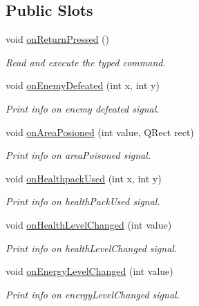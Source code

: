 \subsection*{Public Slots}
\begin{DoxyCompactItemize}
\item 
void \hyperlink{classWorldTerminalView_abca57ada64d0d466fad4e48b26283ee7}{on\+Return\+Pressed} ()\hypertarget{classWorldTerminalView_abca57ada64d0d466fad4e48b26283ee7}{}\label{classWorldTerminalView_abca57ada64d0d466fad4e48b26283ee7}

\begin{DoxyCompactList}\small\item\em Read and execute the typed command. \end{DoxyCompactList}\item 
void \hyperlink{classWorldTerminalView_a39a7a5c66e6184474cf5e43182cca8df}{on\+Enemy\+Defeated} (int x, int y)
\begin{DoxyCompactList}\small\item\em Print info on enemy defeated signal. \end{DoxyCompactList}\item 
void \hyperlink{classWorldTerminalView_ab6ebb9b798c452dbb7bc6859e6c0082c}{on\+Area\+Posioned} (int value, Q\+Rect rect)
\begin{DoxyCompactList}\small\item\em Print info on area\+Poisoned signal. \end{DoxyCompactList}\item 
void \hyperlink{classWorldTerminalView_a9d400f81edbf0b5f6f2779a71311dadf}{on\+Healthpack\+Used} (int x, int y)
\begin{DoxyCompactList}\small\item\em Print info on health\+Pack\+Used signal. \end{DoxyCompactList}\item 
void \hyperlink{classWorldTerminalView_a754cab62b8dbff71fce179c1307fefde}{on\+Health\+Level\+Changed} (int value)
\begin{DoxyCompactList}\small\item\em Print info on health\+Level\+Changed signal. \end{DoxyCompactList}\item 
void \hyperlink{classWorldTerminalView_ad912a26b1ec36b4ddc92f98137b7823f}{on\+Energy\+Level\+Changed} (int value)
\begin{DoxyCompactList}\small\item\em Print info on energy\+Level\+Changed signal. \end{DoxyCompactList}\item 

\end{DoxyCompactItemize}
